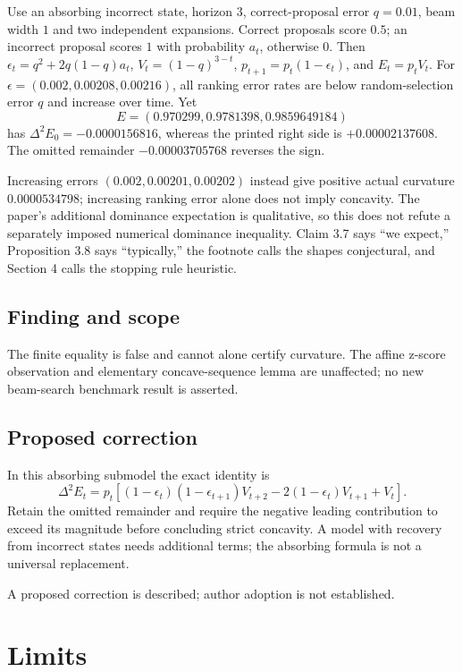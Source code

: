 \documentclass[11pt]{article}
\begin{document}
Use an absorbing incorrect state, horizon \(3\), correct-proposal error \(q=0.01\), beam width \(1\) and two independent expansions. Correct proposals score \(0.5\); an incorrect proposal scores \(1\) with probability \(a_t\), otherwise \(0\). Then \(\epsilon_t=q^2+2q(1-q)a_t\), \(V_t=(1-q)^{3-t}\), \(p_{t+1}=p_t(1-\epsilon_t)\), and \(E_t=p_tV_t\). For \(\epsilon=(0.002,0.00208,0.00216)\), all ranking error rates are below random-selection error \(q\) and increase over time. Yet \[E=(0.970299,0.9781398,0.9859649184)\] has \(\Delta^2E_0=-0.0000156816\), whereas the printed right side is \(+0.00002137608\). The omitted remainder \(-0.00003705768\) reverses the sign.

Increasing errors \((0.002,0.00201,0.00202)\) instead give positive actual curvature \(0.0000534798\); increasing ranking error alone does not imply concavity. The paper’s additional dominance expectation is qualitative, so this does not refute a separately imposed numerical dominance inequality. Claim 3.7 says “we expect,” Proposition 3.8 says “typically,” the footnote calls the shapes conjectural, and Section 4 calls the stopping rule heuristic.

\subsection*{Finding and scope}

The finite equality is false and cannot alone certify curvature. The affine z-score observation and elementary concave-sequence lemma are unaffected; no new beam-search benchmark result is asserted.

\subsection*{Proposed correction}

In this absorbing submodel the exact identity is \[\Delta^2E_t=p_t[(1-\epsilon_t)(1-\epsilon_{t+1})V_{t+2}-2(1-\epsilon_t)V_{t+1}+V_t].\] Retain the omitted remainder and require the negative leading contribution to exceed its magnitude before concluding strict concavity. A model with recovery from incorrect states needs additional terms; the absorbing formula is not a universal replacement.

A proposed correction is described; author adoption is not established.

\section*{Limits}
\end{document}
